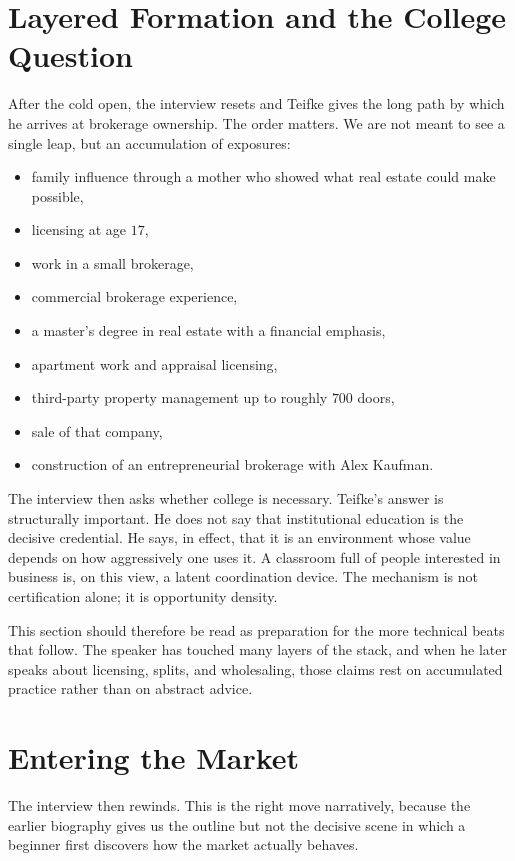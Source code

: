 \section{Layered Formation and the College Question}

After the cold open, the interview resets and Teifke gives the long path by which he arrives at brokerage ownership. The order matters. We are not meant to see a single leap, but an accumulation of exposures:
\begin{itemize}
\item family influence through a mother who showed what real estate could make possible,
\item licensing at age \(17\),
\item work in a small brokerage,
\item commercial brokerage experience,
\item a master's degree in real estate with a financial emphasis,
\item apartment work and appraisal licensing,
\item third-party property management up to roughly \(700\) doors,
\item sale of that company,
\item construction of an entrepreneurial brokerage with Alex Kaufman.
\end{itemize}

The interview then asks whether college is necessary. Teifke's answer is structurally important. He does not say that institutional education is the decisive credential. He says, in effect, that it is an environment whose value depends on how aggressively one uses it. A classroom full of people interested in business is, on this view, a latent coordination device. The mechanism is not certification alone; it is opportunity density.

This section should therefore be read as preparation for the more technical beats that follow. The speaker has touched many layers of the stack, and when he later speaks about licensing, splits, and wholesaling, those claims rest on accumulated practice rather than on abstract advice.

\section{Entering the Market}

The interview then rewinds. This is the right move narratively, because the earlier biography gives us the outline but not the decisive scene in which a beginner first discovers how the market actually behaves.

